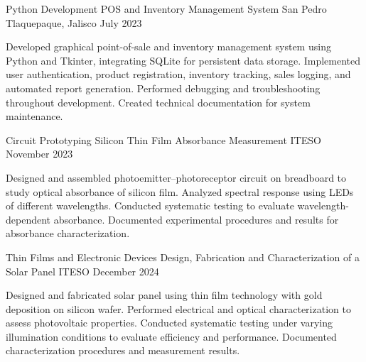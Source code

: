 \begin{cventries}
  
    \cventry
    {Python Development}
    {POS and Inventory Management System}
    {San Pedro Tlaquepaque, Jalisco}
    {July 2023}
    {
      \begin{cvitemsNoBullet}
        \item {Developed graphical point-of-sale and inventory management system using Python and Tkinter, integrating SQLite
                    \newline for persistent data storage. Implemented user authentication, product registration, inventory tracking, sales logging,
                    \newline and automated report generation. Performed debugging and troubleshooting throughout development. Created
                    \newline technical documentation for system maintenance.}
      \end{cvitemsNoBullet}
    }

    \cventry
    {Circuit Prototyping}
    {Silicon Thin Film Absorbance Measurement}
    {ITESO}
    {November 2023}
    {
      \begin{cvitemsNoBullet}
        \item {Designed and assembled photoemitter–photoreceptor circuit on breadboard to study optical absorbance of silicon film.
                    \newline Analyzed spectral response using LEDs of different wavelengths. Conducted systematic testing to evaluate wavelength-
                    \newline dependent absorbance. Documented experimental procedures and results for absorbance characterization.}
      \end{cvitemsNoBullet}
    }

    \cventry
    {Thin Films and Electronic Devices}
    {Design, Fabrication and Characterization of a Solar Panel}
    {ITESO}
    {December 2024}
    {
      \begin{cvitemsNoBullet}
        \item {Designed and fabricated solar panel using thin film technology with gold deposition on silicon wafer. Performed electrical
                    \newline and optical characterization to assess photovoltaic properties. Conducted systematic testing under varying illumination
                    \newline conditions to evaluate efficiency and performance. Documented characterization procedures and measurement results.}
      \end{cvitemsNoBullet}
    }


\end{cventries}
